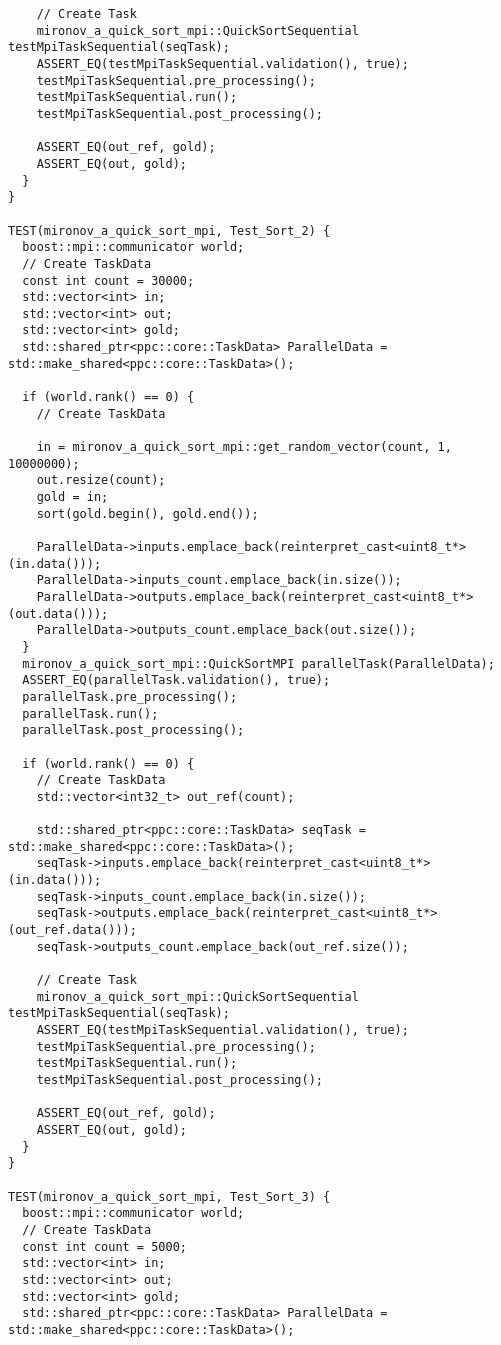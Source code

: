 \documentclass[12pt]{article}
\begin{document}
\begin{lstlisting}
    // Create Task
    mironov_a_quick_sort_mpi::QuickSortSequential testMpiTaskSequential(seqTask);
    ASSERT_EQ(testMpiTaskSequential.validation(), true);
    testMpiTaskSequential.pre_processing();
    testMpiTaskSequential.run();
    testMpiTaskSequential.post_processing();

    ASSERT_EQ(out_ref, gold);
    ASSERT_EQ(out, gold);
  }
}

TEST(mironov_a_quick_sort_mpi, Test_Sort_2) {
  boost::mpi::communicator world;
  // Create TaskData
  const int count = 30000;
  std::vector<int> in;
  std::vector<int> out;
  std::vector<int> gold;
  std::shared_ptr<ppc::core::TaskData> ParallelData = std::make_shared<ppc::core::TaskData>();

  if (world.rank() == 0) {
    // Create TaskData

    in = mironov_a_quick_sort_mpi::get_random_vector(count, 1, 10000000);
    out.resize(count);
    gold = in;
    sort(gold.begin(), gold.end());

    ParallelData->inputs.emplace_back(reinterpret_cast<uint8_t*>(in.data()));
    ParallelData->inputs_count.emplace_back(in.size());
    ParallelData->outputs.emplace_back(reinterpret_cast<uint8_t*>(out.data()));
    ParallelData->outputs_count.emplace_back(out.size());
  }
  mironov_a_quick_sort_mpi::QuickSortMPI parallelTask(ParallelData);
  ASSERT_EQ(parallelTask.validation(), true);
  parallelTask.pre_processing();
  parallelTask.run();
  parallelTask.post_processing();

  if (world.rank() == 0) {
    // Create TaskData
    std::vector<int32_t> out_ref(count);

    std::shared_ptr<ppc::core::TaskData> seqTask = std::make_shared<ppc::core::TaskData>();
    seqTask->inputs.emplace_back(reinterpret_cast<uint8_t*>(in.data()));
    seqTask->inputs_count.emplace_back(in.size());
    seqTask->outputs.emplace_back(reinterpret_cast<uint8_t*>(out_ref.data()));
    seqTask->outputs_count.emplace_back(out_ref.size());

    // Create Task
    mironov_a_quick_sort_mpi::QuickSortSequential testMpiTaskSequential(seqTask);
    ASSERT_EQ(testMpiTaskSequential.validation(), true);
    testMpiTaskSequential.pre_processing();
    testMpiTaskSequential.run();
    testMpiTaskSequential.post_processing();

    ASSERT_EQ(out_ref, gold);
    ASSERT_EQ(out, gold);
  }
}

TEST(mironov_a_quick_sort_mpi, Test_Sort_3) {
  boost::mpi::communicator world;
  // Create TaskData
  const int count = 5000;
  std::vector<int> in;
  std::vector<int> out;
  std::vector<int> gold;
  std::shared_ptr<ppc::core::TaskData> ParallelData = std::make_shared<ppc::core::TaskData>();


\end{lstlisting}
\end{document}

